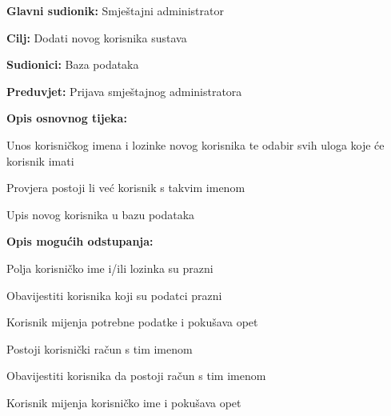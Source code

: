 				\noindent {}
				\begin{packed_item}
					
					\item \textbf{Glavni sudionik: }Smještajni administrator
					\item  \textbf{Cilj:} Dodati novog korisnika sustava
					\item  \textbf{Sudionici:} Baza podataka
					\item  \textbf{Preduvjet:} Prijava smještajnog administratora
					\item  \textbf{Opis osnovnog tijeka:}
					
					\item[] \begin{packed_enum}
						
						\item Unos korisničkog imena i lozinke novog korisnika te odabir svih uloga koje će korisnik imati
						\item Provjera postoji li već korisnik s takvim imenom
						\item Upis novog korisnika u bazu podataka
					\end{packed_enum}
					
					\item  \textbf{Opis mogućih odstupanja:}
					
					\item[] \begin{packed_item}
						
						\item[2.a] Polja korisničko ime i/ili lozinka su prazni
						\item[] \begin{packed_enum}
							
							\item Obavijestiti korisnika koji su podatci prazni
							\item Korisnik mijenja potrebne podatke i pokušava opet
							
						\end{packed_enum}
						\item[2.b] Postoji korisnički račun s tim imenom
						\item[] \begin{packed_enum}
							
							\item Obavijestiti korisnika da postoji račun s tim imenom
							\item Korisnik mijenja korisničko ime i pokušava opet
							

\end{packed_enum}
\end{packed_item}
\end{packed_item}
